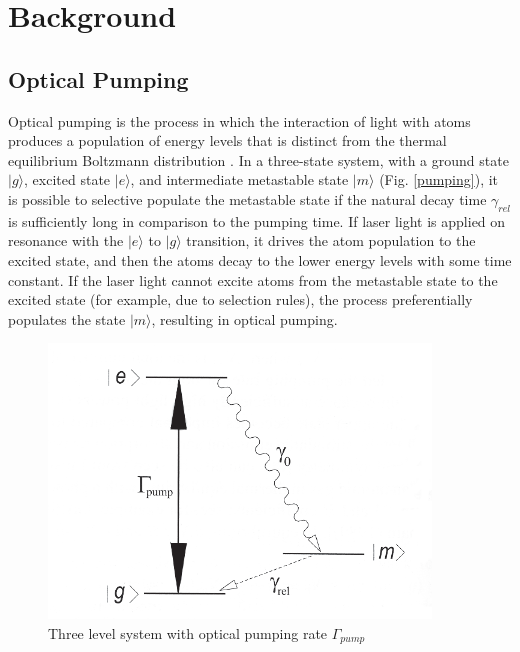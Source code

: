 
\section{Background}\label{background}

\subsection{Optical Pumping}

Optical pumping is the process in which the interaction of light with
atoms produces a population of energy levels that is distinct from the
thermal equilibrium Boltzmann distribution \cite{bernheim}. In a
three-state system, with a ground state $|g\rangle$, excited state
$|e\rangle$, and intermediate metastable state $|m\rangle$
(Fig. \ref{pumping}), it is possible to selective populate the metastable
state if the natural decay time $\gamma_{rel}$ is sufficiently long in
comparison to the pumping time. If laser light is applied on resonance
with the $|e\rangle$ to $|g\rangle$ transition, it drives the atom
population to the excited state, and then the atoms decay to the lower
energy levels with some time constant. If the laser light cannot
excite atoms from the metastable state to the excited state (for
example, due to selection rules), the process preferentially populates
the state $|m\rangle$, resulting in optical pumping.


\begin{figure}[h]
\begin{center}
\includegraphics[width=4in]{figures/pumping.eps}
\caption{\small{Three level system with optical pumping rate $\Gamma_{pump}$}}
\label{fig:pumping}
\end{center}
\end{figure}


